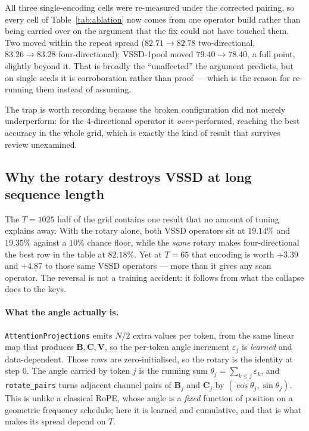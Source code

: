 \documentclass[11pt,a4paper]{article}
\begin{document}
All three single-encoding cells were re-measured under the corrected pairing, so
every cell of Table~\ref{tab:ablation} now comes from one operator build rather
than being carried over on the argument that the fix could not have touched them.
Two moved within the repeat spread ($82.71\to82.78$ two-directional,
$83.26\to83.28$ four-directional); VSSD-1pool moved $79.40\to78.40$, a full point,
slightly beyond it. That is broadly the ``unaffected'' the argument predicts, but
on single seeds it is corroboration rather than proof --- which is the reason for
re-running them instead of assuming.

The trap is worth recording because the broken configuration did not merely
underperform: for the
4-directional operator it \emph{over}-performed, reaching the best accuracy in the
whole grid, which is exactly the kind of result that survives review unexamined.

\subsection{Why the rotary destroys VSSD at long sequence length}
\label{sec:rotary-vssd}
The $T{=}1025$ half of the grid contains one result that no amount of tuning
explains away. With the rotary alone, both VSSD operators sit at $19.14\%$ and
$19.35\%$ against a $10\%$ chance floor, while the \emph{same} rotary makes
four-directional the best row in the table at $82.18\%$. Yet at $T{=}65$ that
encoding is worth $+3.39$ and $+4.87$ to those same VSSD operators --- more than it
gives any scan operator. The reversal is not a training accident: it follows from
what the collapse does to the keys.

\paragraph{What the angle actually is.}
\texttt{AttentionProjections} emits $N/2$ extra values per token, from the same
linear map that produces $\bm{B},\bm{C},\bm{V}$, so the per-token angle increment
$\varepsilon_j$ is \emph{learned} and data-dependent. Those rows are
zero-initialised, so the rotary is the identity at step $0$. The angle carried by
token $j$ is the running sum $\theta_j=\sum_{k\le j}\varepsilon_k$, and
\texttt{rotate\_pairs} turns adjacent channel pairs of $\bm{B}_j$ and $\bm{C}_j$ by
$(\cos\theta_j,\sin\theta_j)$. This is unlike a classical RoPE, whose angle is a
\emph{fixed} function of position on a geometric frequency schedule; here it is
learned and cumulative, and that is what makes its spread depend on $T$.
\end{document}
